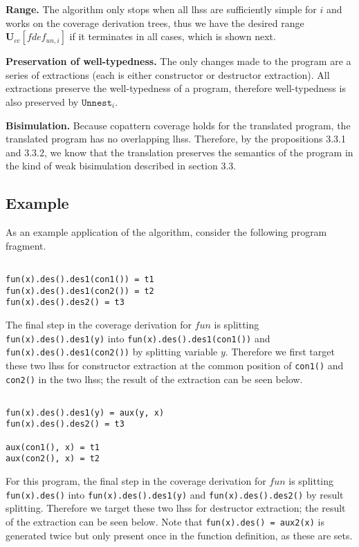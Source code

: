 \textbf{Range.} The algorithm only stops when all lhss are sufficiently simple for $i$ and works on the coverage derivation trees, thus we have the desired range $\mathbf{U}_{cc}[fdef_{un,i}]$ if it terminates in all cases, which is shown next.

\textbf{Preservation of well-typedness.} The only changes made to the program are a series of extractions (each is either constructor or destructor extraction). All extractions preserve the well-typedness of a program, therefore well-typedness is also preserved by $\texttt{Unnest}_i$.

\textbf{Bisimulation.} Because copattern coverage holds for the translated program, the translated program has no overlapping lhss. Therefore, by the propositions 3.3.1 and 3.3.2, we know that the translation preserves the semantics of the program in the kind of weak bisimulation described in section 3.3.

\subsection{Example}

As an example application of the algorithm, consider the following program fragment.

\begin{lstlisting}

fun(x).des().des1(con1()) = t1
fun(x).des().des1(con2()) = t2
fun(x).des().des2() = t3

\end{lstlisting}

The final step in the coverage derivation for $fun$ is splitting \texttt{fun(x).des().des1(y)} into \texttt{fun(x).des().des1(con1())} and \texttt{fun(x).des().des1(con2())} by splitting variable $y$. Therefore we first target these two lhss for constructor extraction at the common position of \texttt{con1()} and \texttt{con2()} in the two lhss; the result of the extraction can be seen below.

\begin{lstlisting}

fun(x).des().des1(y) = aux(y, x)
fun(x).des().des2() = t3

aux(con1(), x) = t1
aux(con2(), x) = t2

\end{lstlisting}

For this program, the final step in the coverage derivation for $fun$ is splitting \texttt{fun(x).des()} into \texttt{fun(x).des().des1(y)} and \texttt{fun(x).des().des2()} by result splitting. Therefore we target these two lhss for destructor extraction; the result of the extraction can be seen below. Note that \texttt{fun(x).des() = aux2(x)} is generated twice but only present once in the function definition, as these are sets.


